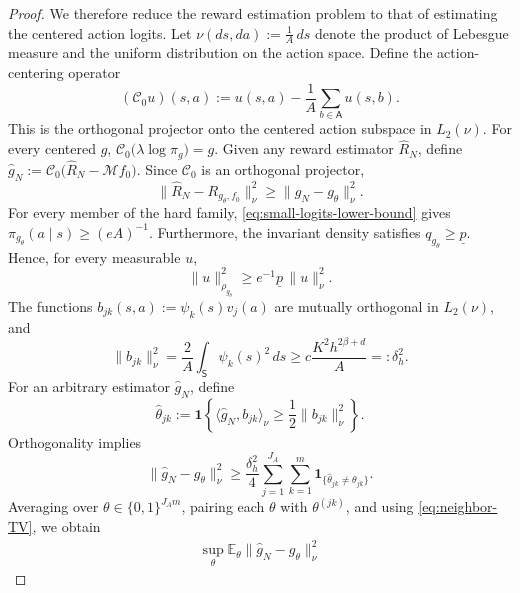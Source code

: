 \documentclass{article}
\theoremstyle{definition}
\theoremstyle{remark}
\theoremstyle{plain}
\numberwithin{equation}{section}
\begin{document}
\begin{proof}
We therefore reduce the reward estimation problem to that of estimating the centered action logits. Let \(\nu(ds,da)
    :=
    \frac1A\,ds\)
denote the product of Lebesgue measure and the uniform distribution on
the action space. Define the action-centering operator
\[
    (\mathcal C_0 u)(s,a)
    :=
    u(s,a) 
    -
    \frac1A
    \sum_{b\in\mathsf A}u(s,b).
\]
This is the orthogonal projector onto the centered action subspace in
\(L_2(\nu)\). For every centered \(g\), \(    \mathcal C_0
    \bigl(
        \lambda\log\pi_g
    \bigr)
    =
    g.\)
Given any reward estimator \(\widehat R_N\), define \(\widehat g_N
    :=
    \mathcal C_0
    \bigl(
        \widehat R_N-\mathcal M f_0
    \bigr).\)
Since \(\mathcal C_0\) is an orthogonal projector,
\begin{equation}
\label{eq:reward-to-centered-logit}
    \|
        \widehat R_N-R_{g_\theta,f_0}
    \|_\nu^2
    \geq
    \|
        \widehat g_N-g_\theta
    \|_\nu^2.
\end{equation}
For every member of the hard family,
\eqref{eq:small-logits-lower-bound} gives \(\pi_{g_\theta}(a\mid s)
    \geq
    {(eA)^{-1}}.\)
Furthermore, the invariant density satisfies
\(q_{g_\theta}\geq\underline p\). Hence, for every measurable \(u\),
\begin{equation}
\label{eq:rho-dominates-nu}
    \|u\|_{\rho_{g_\theta}}^2
    \geq
    e^{-1}\underline p\,
    \|u\|_\nu^2.
\end{equation}
The functions \( b_{jk}(s,a):=\psi_k(s)v_j(a)\)
are mutually orthogonal in \(L_2(\nu)\), and
\begin{equation}
\label{eq:bit-separation}
    \|b_{jk}\|_\nu^2
    =
    \frac{2}{A}
    \int_{\mathsf S}\psi_k(s)^2\,ds
    \geq
    c
    \frac{
        K^2h^{2\beta+d}
    }{A}
    =:\delta_h^2.
\end{equation}
For an arbitrary estimator \(\widehat g_N\), define
\[
    \widehat\theta_{jk}
    :=
    \mathbf 1
    \left\{
        \langle\widehat g_N,b_{jk}\rangle_\nu
        \geq
        \frac12\|b_{jk}\|_\nu^2
    \right\}.
\]
Orthogonality implies
\[
    \|
        \widehat g_N-g_\theta
    \|_\nu^2
    \geq
    \frac{\delta_h^2}{4}
    \sum_{j=1}^{J_A}
    \sum_{k=1}^m
    \mathbf 1_{\{
        \widehat\theta_{jk}\neq\theta_{jk}
    \}}.
\]
Averaging over \(\theta\in\{0,1\}^{J_A m}\), pairing each
\(\theta\) with \(\theta^{(jk)}\), and using
\eqref{eq:neighbor-TV}, we obtain
\begin{align}
    \sup_\theta
    \mathbb E_\theta
    \|
        \widehat g_N-g_\theta
    \|_\nu^2

\end{align}
\end{proof}
\end{document}
